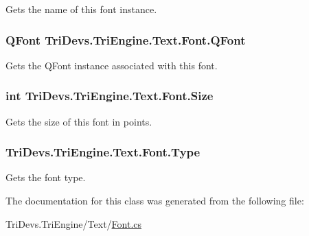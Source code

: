 Gets the name of this font instance. 

\hypertarget{class_tri_devs_1_1_tri_engine_1_1_text_1_1_font_ad39abcf6c6505e2d522b27a8ff65e554}{
\subsubsection[{Q\-Font}]{\setlength{\rightskip}{0pt plus 5cm}Q\-Font Tri\-Devs.\-Tri\-Engine.\-Text.\-Font.\-Q\-Font\hspace{0.3cm}{\ttfamily [get]}}}\label{class_tri_devs_1_1_tri_engine_1_1_text_1_1_font_ad39abcf6c6505e2d522b27a8ff65e554}


Gets the Q\-Font instance associated with this font. 

\hypertarget{class_tri_devs_1_1_tri_engine_1_1_text_1_1_font_ad1d80ab21007e0379a2d18dda7e0b2a2}{
\subsubsection[{Size}]{\setlength{\rightskip}{0pt plus 5cm}int Tri\-Devs.\-Tri\-Engine.\-Text.\-Font.\-Size\hspace{0.3cm}{\ttfamily [get]}}}\label{class_tri_devs_1_1_tri_engine_1_1_text_1_1_font_ad1d80ab21007e0379a2d18dda7e0b2a2}


Gets the size of this font in points. 

\hypertarget{class_tri_devs_1_1_tri_engine_1_1_text_1_1_font_a99190b803ae96c50fa724b578a8c03a6}{
\subsubsection[{Type}]{ Tri\-Devs.\-Tri\-Engine.\-Text.\-Font.\-Type\hspace{0.3cm}{\ttfamily [get]}}}\label{class_tri_devs_1_1_tri_engine_1_1_text_1_1_font_a99190b803ae96c50fa724b578a8c03a6}


Gets the font type. 



The documentation for this class was generated from the following file\-:\begin{DoxyCompactItemize}
\item 
Tri\-Devs.\-Tri\-Engine/\-Text/\hyperlink{_font_8cs}{Font.\-cs}\end{DoxyCompactItemize}
